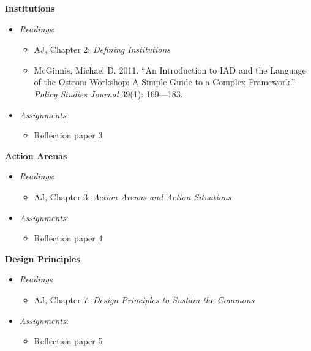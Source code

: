 \week \textbf{Institutions}

\begin{itemize}

\item
  \emph{Readings}:

  \begin{itemize}
  
  \item
    AJ, Chapter 2: \emph{Defining Institutions}
  \item
    McGinnis, Michael D. 2011. ``An Introduction to IAD and the Language
    of the Ostrom Workshop: A Simple Guide to a Complex Framework.''
    \emph{Policy Studies Journal} 39(1): 169---183.
  \end{itemize}
\item
  \emph{Assignments}:

  \begin{itemize}
  
  \item
    Reflection paper 3
  \end{itemize}
\end{itemize}

\week \textbf{Action Arenas}

\begin{itemize}

\item
  \emph{Readings}:

  \begin{itemize}
  
  \item
    AJ, Chapter 3: \emph{Action Arenas and Action Situations}
  \end{itemize}
\item
  \emph{Assignments}:

  \begin{itemize}
  
  \item
    Reflection paper 4
  \end{itemize}
\end{itemize}

\week \textbf{Design Principles}

\begin{itemize}

\item
  \emph{Readings}

  \begin{itemize}
  
  \item
    AJ, Chapter 7: \emph{Design Principles to Sustain the Commons}
  \end{itemize}
\item
  \emph{Assignments}:

  \begin{itemize}
  
  \item
    Reflection paper 5
  \end{itemize}
\end{itemize}

